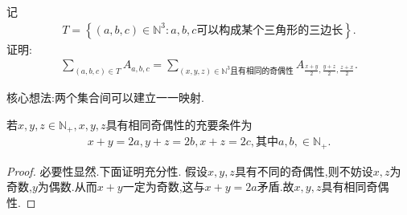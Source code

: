 \documentclass[../../main.tex]{subfiles}%
\begin{document}
\begin{example}
记\begin{align*}
T=\left\{ \left( a,b,c \right) \in \mathbb{N} ^3:a,b,c\text{可以构成某个三角形的三边长} \right\} .
\end{align*}
证明:\begin{align*}
\sum\limits_{\left( a,b,c \right) \in T}{A_{a,b,c}}=\sum\limits_{\left( x,y,z \right) \in \mathbb{N} ^3\text{且有相同的奇偶性}}{A_{\frac{x+y}{2},\frac{y+z}{2},\frac{z+x}{2}}}.
\end{align*}   
\end{example}
\begin{note}
核心想法:两个集合间可以建立一一映射.
\end{note}
\begin{conclusion}
若$x,y,z\in \mathbb{N} _+,x,y,z$具有相同奇偶性的充要条件为
\begin{align*}
x+y=2a,y+z=2b,x+z=2c,\text{其中}a,b,\in \mathbb{N} _+.
\end{align*}
\begin{proof}
必要性显然.下面证明充分性.
假设$x,y,z$具有不同的奇偶性,则不妨设$x,z$为奇数,$y$为偶数.从而$x+y$一定为奇数,这与$x+y=2a$矛盾.故$x,y,z$具有相同奇偶性.
\end{proof}
\end{conclusion}
\end{document}
